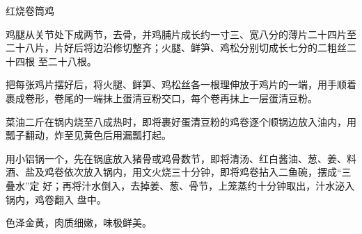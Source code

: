 \begin{recipe}{红烧卷筒鸡}

\ingredients


\preparation

\step 鸡腿从关节处下成两节，去骨，并鸡脯片成长约一寸三、宽八分的薄片二十四片至
二十八片，片好后将边沿修切整齐；火腿、鲜笋、鸡松分别切成长七分的二粗丝二十四根
至二十八根。

\step 把每张鸡片摆好后，将火腿、鲜笋、鸡松丝各一根理伸放于鸡片的一端，用手顺着
裹成卷形，卷尾的一端抹上蛋清豆粉交口，每个卷再抹上一层蛋清豆粉。

\step 菜油二斤在锅内烧至八成热时，即将裹好蛋清豆粉的鸡卷逐个顺锅边放入油内，用
瓢子翻动，炸至见黄色后用漏瓢打起。

\step 用小铝锅一个，先在锅底放入猪骨或鸡骨数节，即将清汤、红白酱油、葱、姜、料
酒、盐及鸡卷依次放入锅内，用文火烧三十分钟，即将鸡卷拈入二鱼碗，摆成“三叠水”定
好；再将汁水倒入，去掉姜、葱、骨节，上笼蒸约十分钟取出，汁水泌入锅内，鸡卷翻入
盘中。

\features

色泽金黄，肉质细嫩，味极鲜美。

\end{recipe}

